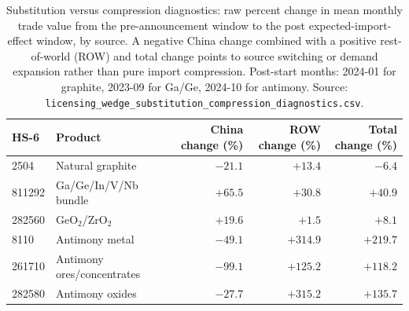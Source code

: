 \begin{table}[H]
\centering
\caption{Substitution versus compression diagnostics: raw percent change in mean
monthly trade value from the pre-announcement window to the post
expected-import-effect window, by source. A negative China change combined with a
positive rest-of-world (ROW) and total change points to source switching or
demand expansion rather than pure import compression. Post-start months: 2024-01
for graphite, 2023-09 for Ga/Ge, 2024-10 for antimony. Source:
\texttt{licensing\_wedge\_substitution\_compression\_diagnostics.csv}.}
\label{tab:subcompression}
\footnotesize
\begin{tabular}{llrrr}
\toprule
HS-6 & Product & China change (\%) & ROW change (\%) & Total change (\%) \\
\midrule
2504   & Natural graphite           & $-21.1$ & $+13.4$  & $-6.4$ \\
811292 & Ga/Ge/In/V/Nb bundle      & $+65.5$ & $+30.8$  & $+40.9$ \\
282560 & GeO$_2$/ZrO$_2$           & $+19.6$ & $+1.5$   & $+8.1$ \\
8110   & Antimony metal             & $-49.1$ & $+314.9$ & $+219.7$ \\
261710 & Antimony ores/concentrates & $-99.1$ & $+125.2$ & $+118.2$ \\
282580 & Antimony oxides            & $-27.7$ & $+315.2$ & $+135.7$ \\
\bottomrule
\end{tabular}
\end{table}
